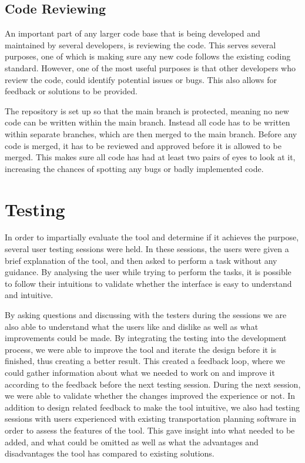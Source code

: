     \subsection{Code Reviewing} \label{sub:code-reviewing}
        An important part of any larger code base that is being developed and maintained by several developers, is reviewing the code. This serves several purposes, one of which is making sure any new code follows the existing coding standard. However, one of the most useful purposes is that other developers who review the code, could identify potential issues or bugs. This also allows for feedback or solutions to be provided.

        The repository is set up so that the main branch is protected, meaning no new code can be written within the main branch. Instead all code has to be written within separate branches, which are then merged to the main branch. Before any code is merged, it has to be reviewed and approved before it is allowed to be merged. This makes sure all code has had at least two pairs of eyes to look at it, increasing the chances of spotting any bugs or badly implemented code.

\section{Testing}
    In order to impartially evaluate the tool and determine if it achieves the purpose, several user testing sessions were held. In these sessions, the users were given a brief explanation of the tool, and then asked to perform a task without any guidance. By analysing the user while trying to perform the tasks, it is possible to follow their intuitions to validate whether the interface is easy to understand and intuitive.

    By asking questions and discussing with the testers during the sessions we are also able to understand what the users like and dislike as well as what improvements could be made. By integrating the testing into the development process, we were able to improve the tool and iterate the design before it is finished, thus creating a better result. This created a feedback loop, where we could gather information about what we needed to work on and improve it according to the feedback before the next testing session. During the next session, we were able to validate whether the changes improved the experience or not. In addition to design related feedback to make the tool intuitive, we also had testing sessions with users experienced with existing transportation planning software in order to assess the features of the tool. This gave insight into what needed to be added, and what could be omitted as well as what the advantages and disadvantages the tool has compared to existing solutions.